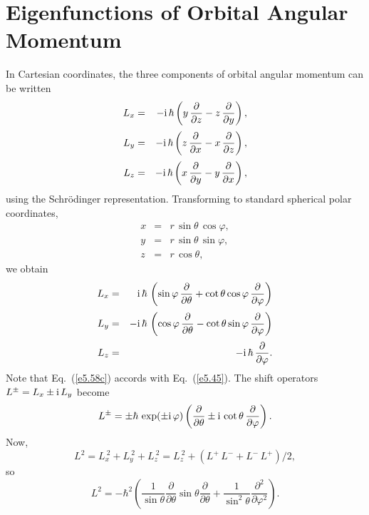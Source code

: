 \section{Eigenfunctions of Orbital Angular Momentum}\label{s5.4}
In Cartesian coordinates, the three components of orbital angular
momentum can be written 
\begin{eqnarray}
L_x &=& -{\rm i}\,\hbar\left(y\,\frac{\partial}{\partial z} - z\,\frac{\partial}
{\partial y}\right),\\[0.5ex]
L_y &=& -{\rm i}\,\hbar\left(z\,\frac{\partial}{\partial x} - x\,\frac{\partial}
{\partial z}\right),\\[0.5ex]
L_z &=& -{\rm i}\,\hbar\left(x\,\frac{\partial}{\partial y} - y\,\frac{\partial}
{\partial x}\right),
\end{eqnarray}
using the Schr\"{o}dinger representation. Transforming to standard
spherical polar coordinates,
\begin{eqnarray}
x &=& r \,\sin\theta\, \cos\varphi,\\[0.5ex]
y &=& r\, \sin\theta\, \sin\varphi,\\[0.5ex]
z &=& r\,\cos\theta,
\end{eqnarray}
we obtain
\begin{eqnarray}\label{e5.58a}
L_x &=& {\rm i}\,\hbar\,\left(\sin\varphi\, \frac{\partial}{\partial \theta}
+ \cot\theta \cos\varphi\,\frac{\partial}{\partial \varphi}\right)
\\[0.5ex]
L_y &=& -{\rm i} \,\hbar\,\left(\cos\varphi\, \frac{\partial}{\partial\theta}
-\cot\theta \sin\varphi \,\frac{\partial}{\partial \varphi}\right)\\[0.5ex]
L_z&=& -{\rm i}\,\hbar\,\frac{\partial}{\partial\varphi}.\label{e5.58c}
\end{eqnarray}
Note that Eq.~(\ref{e5.58c}) accords with Eq.~(\ref{e5.45}). The shift
operators $L^\pm = L_x \pm {\rm i}\,L_y$ become
\begin{equation}\label{e5.59}
L^\pm = \pm \hbar\,\exp(\pm{\rm i}\,\varphi)\left(\frac{\partial}{\partial\theta}
\pm{\rm i} \,\cot\theta\,\frac{\partial}{\partial\varphi}\right).
\end{equation}
Now,
\begin{equation}
L^2 = L_x^{~2}+L_y^{~2}+L_z^{~2} = L_z^{~2} + (L^+\, L^- + L^- \,L^+) /2,
\end{equation}
so
\begin{equation}\label{e5.61}
L^2 = - \hbar^2\left( \frac{1}{\sin\theta}\frac{\partial}{\partial\theta}
\sin\theta\frac{\partial}{\partial\theta} + \frac{1}{\sin^2\theta}\frac{\partial^2}
{\partial\varphi^2}\right).
\end{equation}

